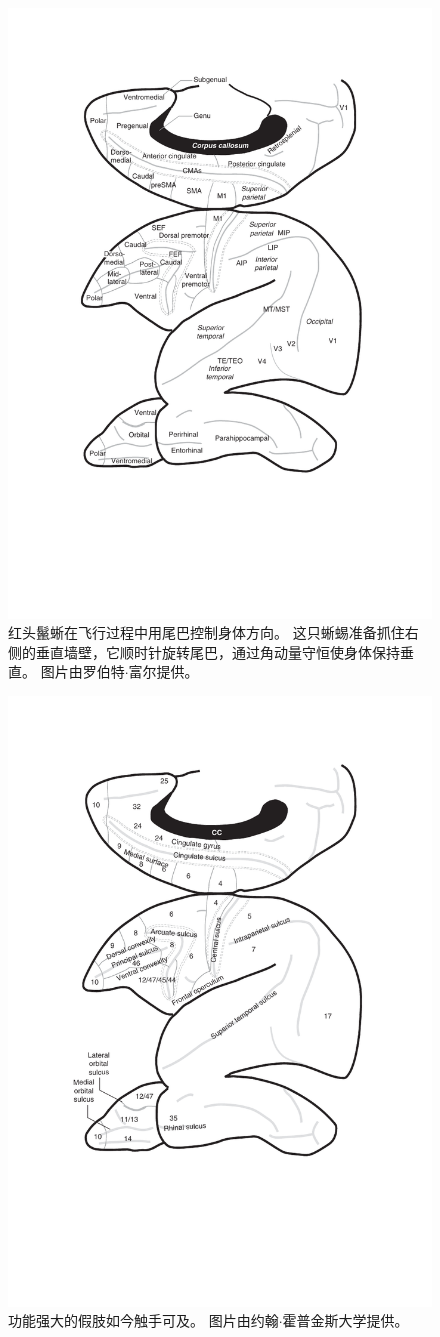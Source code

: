 \begin{figure}[!htb]
	\centering
	\includegraphics[width=1.0\linewidth]{chap1/1_4}
	\caption{红头鬣蜥在飞行过程中用尾巴控制身体方向。
		这只蜥蜴准备抓住右侧的垂直墙壁，它顺时针旋转尾巴，通过角动量守恒使身体保持垂直。
		图片由罗伯特$\cdot$富尔提供。 \label{fig:1_4}}
\end{figure}


\begin{figure}[!htb]
	\centering
	\includegraphics[width=0.5\linewidth]{chap1/1_5}
	\caption{功能强大的假肢如今触手可及。
		图片由约翰$\cdot$霍普金斯大学提供。 \label{fig:1_5}}
\end{figure}


